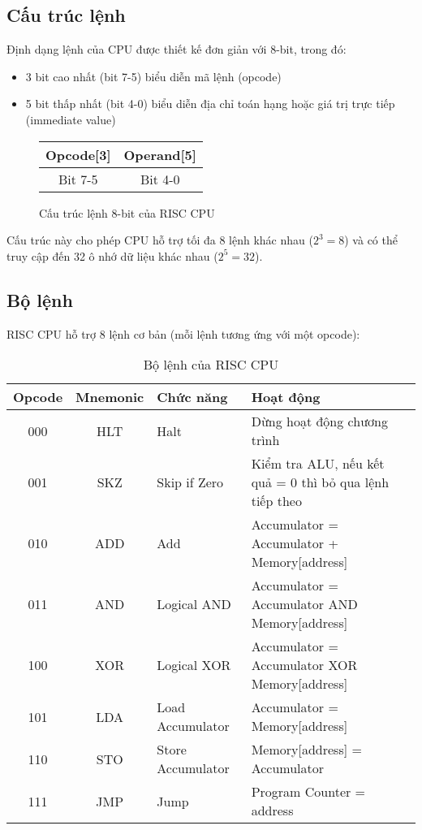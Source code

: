 \subsection{Cấu trúc lệnh}

Định dạng lệnh của CPU được thiết kế đơn giản với 8-bit, trong đó:
\begin{itemize}
    \item 3 bit cao nhất (bit 7-5) biểu diễn mã lệnh (opcode)
    \item 5 bit thấp nhất (bit 4-0) biểu diễn địa chỉ toán hạng hoặc giá trị trực tiếp (immediate value)
\end{itemize}

\begin{figure}[h]
\centering
\begin{tabular}{|c|c|}
\hline
Opcode[3] & Operand[5] \\
\hline
Bit 7-5 & Bit 4-0 \\
\hline
\end{tabular}
\caption{Cấu trúc lệnh 8-bit của RISC CPU}
\label{fig:instruction_format}
\end{figure}

Cấu trúc này cho phép CPU hỗ trợ tối đa 8 lệnh khác nhau ($2^3 = 8$) và có thể truy cập đến 32 ô nhớ dữ liệu khác nhau ($2^5 = 32$).

\subsection{Bộ lệnh}

RISC CPU hỗ trợ 8 lệnh cơ bản (mỗi lệnh tương ứng với một opcode):

\begin{table}[h]
\centering
\begin{tabular}{|c|c|l|p{}|}
\hline
\textbf{Opcode} & \textbf{Mnemonic} & \textbf{Chức năng} & \textbf{Hoạt động} \\
\hline
000 & HLT & Halt & Dừng hoạt động chương trình \\
\hline
001 & SKZ & Skip if Zero & Kiểm tra ALU, nếu kết quả = 0 thì bỏ qua lệnh tiếp theo \\
\hline
010 & ADD & Add & Accumulator = Accumulator + Memory[address] \\
\hline
011 & AND & Logical AND & Accumulator = Accumulator AND Memory[address] \\
\hline
100 & XOR & Logical XOR & Accumulator = Accumulator XOR Memory[address] \\
\hline
101 & LDA & Load Accumulator & Accumulator = Memory[address] \\
\hline
110 & STO & Store Accumulator & Memory[address] = Accumulator \\
\hline
111 & JMP & Jump & Program Counter = address \\
\hline
\end{tabular}
\caption{Bộ lệnh của RISC CPU}
\label{tab:instruction_set}
\end{table}

